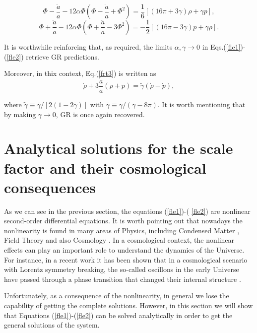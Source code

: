 \begin{equation}
\Phi -\frac{\ddot{a}}{a}-12\alpha \Phi \left( \Phi -\frac{\ddot{a}}{a}+\Phi
^{2}\right) =\frac{1}{6}\left[ \left( 16\pi +3\gamma \right) \rho +\gamma p%
\right] ,  \label{fle1}
\end{equation}%
\begin{equation}
\Phi +\frac{\ddot{a}}{a}-12\alpha \Phi \left( \Phi +\frac{\ddot{a}}{a}-3\Phi
^{2}\right) =-\frac{1}{2}\left[ \left( 16\pi -3\gamma \right) p+\gamma \rho %
\right] .  \label{fle2}
\end{equation}

It is worthwhile reinforcing that, as required, the limits $\alpha ,\gamma
\rightarrow 0$ in Eqs.(\ref{fle1})-(\ref{fle2}) retrieve GR predictions.

Moreover, in thix context, Eq.(\ref{frt3}) is written as%
\begin{equation}
\dot{\rho}+3\frac{\dot{a}}{a}(\rho +p)=\tilde{\gamma}(\dot{\rho}-\dot{p}),
\label{w1}
\end{equation}

\noindent where $\tilde{\gamma}\equiv \bar{\gamma}/[2(1-2\bar{\gamma})]$ with $%
\bar{\gamma}\equiv \gamma /(\gamma -8\pi ).$ It is worth mentioning that by
making $\gamma \rightarrow 0$, GR is once again recovered.

\section{Analytical solutions for the scale factor and their cosmological
consequences}

\label{sec:assf}

As we can see in the previous section, the equations (\ref{fle1})-(%
\ref{fle2}) are nonlinear second-order differential equations. It is worth
pointing out that nowadays the nonlinearity is found in many areas of
Physics, including Condensed Matter \cite{1,1.1,1.2}, Field Theory \cite%
{2.1,2.2,2.3,2.4} and also Cosmology \cite{3,3.1,3.2}. In a cosmological
context, the nonlinear effects can play an important role to understand the
dynamics of the Universe. For instance, in a recent work it has been shown
that in a cosmological scenario with Lorentz symmetry breaking, the
so-called oscillons \cite{5} in the early Universe have passed through a
phase transition that changed their internal structure \cite{4}.

Unfortunately, as a consequence of the nonlinearity, in general we lose the
capability of getting the complete solutions. However, in this section we
will show that Equations (\ref{fle1})-(\ref{fle2}) can be solved
analytically in order to get the general solutions of the system.

